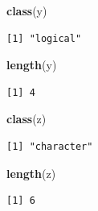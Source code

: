 \documentclass[
]{book}
\newenvironment{Shaded}{\begin{snugshade}}{\end{snugshade}}
\newcommand{\KeywordTok}[1]{\textcolor[rgb]{0.13,0.29,0.53}{\textbf{#1}}}
\newcommand{\NormalTok}[1]{#1}
\begin{document}
\begin{Shaded}
\begin{Highlighting}[]
\KeywordTok{class}\NormalTok{(y)}
\end{Highlighting}
\end{Shaded}

\begin{verbatim}
[1] "logical"
\end{verbatim}

\begin{Shaded}
\begin{Highlighting}[]
\KeywordTok{length}\NormalTok{(y)}
\end{Highlighting}
\end{Shaded}

\begin{verbatim}
[1] 4
\end{verbatim}

\begin{Shaded}
\begin{Highlighting}[]
\KeywordTok{class}\NormalTok{(z)}
\end{Highlighting}
\end{Shaded}

\begin{verbatim}
[1] "character"
\end{verbatim}

\begin{Shaded}
\begin{Highlighting}[]
\KeywordTok{length}\NormalTok{(z)}
\end{Highlighting}
\end{Shaded}

\begin{verbatim}
[1] 6
\end{verbatim}
\end{document}

